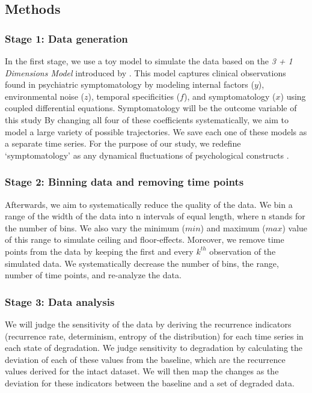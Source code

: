 \documentclass[utf8]{FrontiersinVancouver}
\begin{document}
\subsection{Methods}

\subsubsection{Stage 1: Data generation}

In the first stage, we use a toy model to simulate the data based on the \textit{3 + 1 Dimensions Model} introduced by \cite{gauldDynamicalSystemsComputational2023}. This model captures clinical observations found in psychiatric symptomatology by modeling internal factors ($y$), environmental noise ($z$), temporal specificities ($f$), and symptomatology ($x$) using coupled differential equations. Symptomatology will be the outcome variable of this study By changing all four of these coefficients systematically, we aim to model a large variety of possible trajectories. We save each one of these models as a separate time series. For the purpose of our study, we redefine `symptomatology' as any dynamical fluctuations of psychological constructs \citep{olthofComplexityTheoryPsychopathology2023}.

\subsubsection{Stage 2: Binning data and removing time points}

Afterwards, we aim to systematically reduce the quality of the data. We bin a range of the width of the data into n intervals of equal length, where n stands for the number of bins. We also vary the minimum ($min$) and maximum ($max$) value of this range to simulate ceiling and floor-effects. Moreover, we remove time points from the data by keeping the first and every $k^{th}$ observation of the simulated data. We systematically decrease the number of bins, the range, number of time points, and re-analyze the data.

\subsubsection{Stage 3: Data analysis}

We will judge the sensitivity of the data by deriving the recurrence indicators (recurrence rate, determinism, entropy of the distribution) for each time series in each state of degradation. We judge sensitivity to degradation by calculating the deviation of each of these values from the baseline, which are the recurrence values derived for the intact dataset. We will then map the changes as the deviation for these indicators between the baseline and a set of degraded data.
\end{document}
